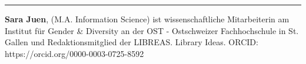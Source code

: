\begin{center}\rule{0.5\linewidth}{0.5pt}\end{center}

\textbf{Sara Juen}, (M.A. Information Science) ist wissenschaftliche
Mitarbeiterin am Institut für Gender \& Diversity an der OST -
Ostschweizer Fachhochschule in St. Gallen und Redaktionsmitglied der
LIBREAS. Library Ideas. ORCID: https://orcid.org/0000-0003-0725-8592
